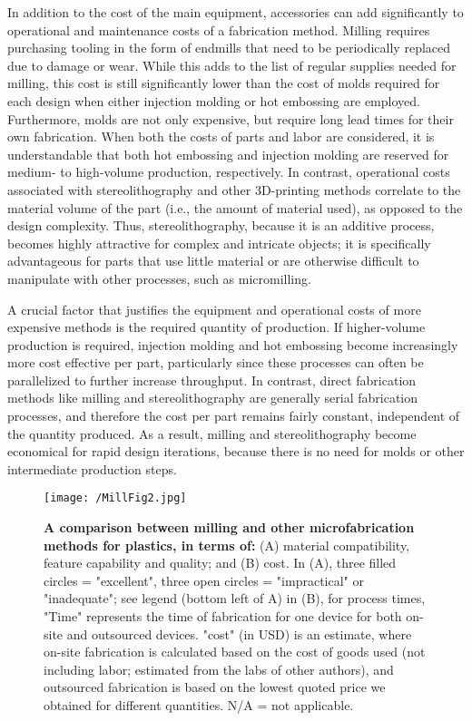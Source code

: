 {In addition to the cost of the main equipment, accessories can add significantly to operational and maintenance costs of a fabrication method. Milling requires purchasing tooling in the form of endmills that need to be periodically replaced due to damage or wear. While this adds to the list of regular supplies needed for milling, this cost is still significantly lower than the cost of molds required for each design when either injection molding or hot embossing are employed. Furthermore, molds are not only expensive, but require long lead times for their own fabrication. When both the costs of parts and labor are considered, it is understandable that both hot embossing and injection molding are reserved for medium- to high-volume production, respectively. In contrast, operational costs associated with stereolithography and other 3D-printing methods correlate to the material volume of the part (i.e., the amount of material used), as opposed to the design complexity. Thus, stereolithography, because it is an additive process, becomes highly attractive for complex and intricate objects; it is specifically advantageous for parts that use little material or are otherwise difficult to manipulate with other processes, such as micromilling. 

A crucial factor that justifies the equipment and operational costs of more expensive methods is the required quantity of production. If higher-volume production is required, injection molding and hot embossing become increasingly more cost effective per part, particularly since these processes can often be parallelized to further increase throughput. In contrast, direct fabrication methods like milling and stereolithography are generally serial fabrication processes, and therefore the cost per part remains fairly constant, independent of the quantity produced. As a result, milling and stereolithography become economical for rapid design iterations, because there is no need for molds or other intermediate production steps.

\begin{figure}[h!] %
\centering
\texttt{[image: /MillFig2.jpg]}
\caption[\textbf{A comparison between milling and other microfabrication methods for plastics}]{\textbf{A comparison between milling and other microfabrication methods for plastics, in terms of:} (A) material compatibility, feature capability and quality; and (B) cost. In (A), three filled circles = "excellent", three open circles = "impractical" or "inadequate"; see legend (bottom left of A) in (B), for process times, "Time" represents the time of fabrication for one device for both on-site and outsourced devices. "cost" (in USD) is an estimate, where on-site fabrication is calculated based on the cost of goods used (not including labor; estimated from the labs of other authors), and outsourced fabrication is based on the lowest quoted price we obtained for different quantities. N/A = not applicable.}
\label{figure:MillFig2}
\end{figure}

}
